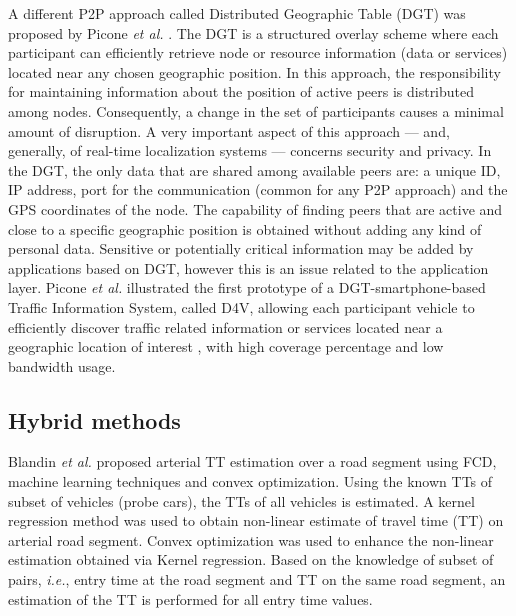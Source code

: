 \documentclass[10pt,onecolumn]{article}
\begin{document}
A different P2P approach called Distributed Geographic Table (DGT) was proposed by Picone \textit{et al.} \cite{Picone2011a, Picone2011b}. The DGT is a structured overlay scheme where each participant can efficiently retrieve node or resource information (data or services) located near any chosen geographic position. In this approach, the responsibility for maintaining information about the position of active peers is distributed among nodes. Consequently, a change in the set of participants causes a minimal amount of disruption. A very important aspect of this approach --- and, generally, of real-time localization systems --- concerns security and privacy. In the DGT, the only data that are shared among available peers are: a unique ID, IP address, port for the communication (common for any P2P approach) and the GPS coordinates of the node. 
The capability of finding peers that are active and close to a specific geographic position is obtained without adding any kind of personal data. Sensitive or potentially critical information may be added by applications based on DGT, however this is an issue related to the application layer.
Picone \textit{et al.} illustrated the first prototype of a DGT-smartphone-based Traffic Information System, called D4V, allowing each participant vehicle to efficiently discover traffic related information or services located near a geographic location of interest \cite{Picone2012D4V}, with high coverage percentage and low bandwidth usage. 



\subsection{Hybrid methods}

Blandin \textit{et al.} \cite{Blandin2009} proposed arterial TT estimation over a road segment using FCD, machine learning techniques and convex optimization. Using the known TTs of subset of vehicles (probe cars), the TTs of all vehicles is estimated. A kernel regression method was used to obtain non-linear estimate of travel time (TT) on arterial road segment. Convex optimization was used to enhance the non-linear estimation obtained via Kernel regression. Based on the knowledge of subset of pairs, \textit{i.e.}, entry time at the road segment and TT on the same road segment, an estimation of the TT is performed for all entry time values.
 
\end{document}
